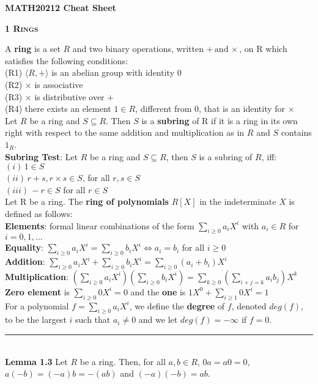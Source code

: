 \documentclass[a4paper]{article}
\begin{document}

\begin{center}
	\huge{\textbf{MATH20212 Cheat Sheet}}\\
\end{center}

\begin{framed}
	\begin{center}
		\textbf{\textsc{1 Rings}}
	\end{center}
	A \textbf{ring} is a set $R$ and two binary operations, written $+ \, \text{and} \, \times$, on R which satisfies the following conditions:\\
	(R1) $\langle R, + \rangle$ is an abelian group with identity 0\\
	(R2) $\times$ is associative\\
	(R3) $\times$ is distributive over $+$\\
	(R4) there exists an element $1 \in R$, different from 0, that is an identity for $\times$\\
	
	\noindent
	Let $R$ be a ring and $S \subseteq R$. Then $S$ is a \textbf{subring} of R if it is a ring in its own right with respect to the same addition and multiplication as in $R$ and $S$ contains $1_R$.\\
	
	\noindent
	\textbf{Subring Test}: Let $R$ be a ring and $S \subseteq R$, then $S$ is a subring of $R$, iff:\\
	$(i) \, 1 \in S$\\
	$(ii) \, r + s, r \times s \in S$, for all $r, s \in S$\\
	$(iii) \, -r \in S$ for all $r \in S$\\
	
	\noindent
	Let R be a ring. The \textbf{ring of polynomials} $R[X]$ in the indeterminate $X$ is defined as follows:\\
	\textbf{Elements}: formal linear combinations of the form $\sum_{i \geq 0}a_iX^i$ with $a_i \in R$ for $i = 0, 1, \dots$\\
	\textbf{Equality}: $\sum_{i \geq 0}a_iX^i = \sum_{i \geq 0}b_iX^i \iff a_i = b_i$ for all $i \geq 0$\\
	\textbf{Addition}: $\sum_{i \geq 0}a_iX^i + \sum_{i \geq 0}b_iX^i = \sum_{i \geq 0}(a_i + b_i)X^i$\\
	\textbf{Multiplication}: $(\sum_{i \geq 0}a_iX^i)(\sum_{i \geq 0}b_iX^i) = \sum_{k \geq 0}(\sum_{i + j = k}a_ib_j)X^k$\\
	\textbf{Zero element} is $\sum_{i \geq 0}0X^i = 0$ and the \textbf{one} is $1X^0 + \sum_{i \geq 1}0X^i = 1$\\
	
	\noindent
	For a polynomial $f = \sum_{i \geq 0}a_iX^i$, we define the \textbf{degree} of $f$, denoted $deg(f)$, to be the largest $i$ such that $a_i \neq 0$ and we let $deg(f) = -\infty$ if $f = 0$.
	
	\noindent\rule{\textwidth}{0.5pt}\\
	
	\noindent
	\textbf{Lemma 1.3} Let $R$ be a ring. Then, for all $a, b \in R$, $0a = a0 = 0$, $a(-b) = (-a)b = -(ab)$ and $(-a)(-b) = ab$.
\end{framed}
\end{document}

